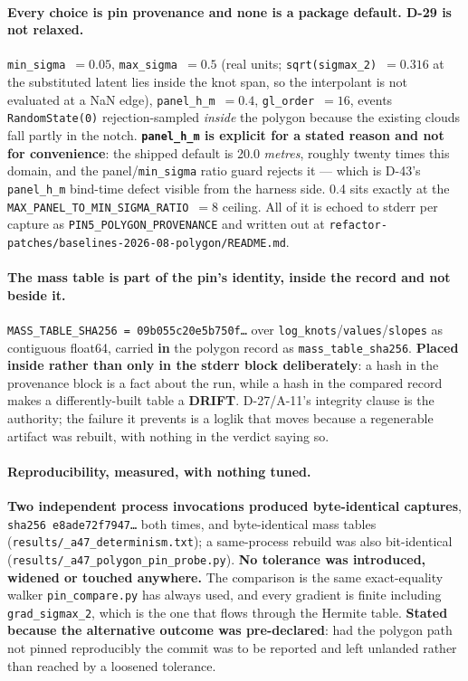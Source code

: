 \documentclass[
  10pt,
]{article}
\begin{document}
\paragraph{Every choice is pin provenance and none is a package default. D-29 is not relaxed.}
\texttt{min\_sigma}~$=0.05$, \texttt{max\_sigma}~$=0.5$ (real units; \texttt{sqrt(sigmax\_2)}~$=0.316$ at the substituted latent lies inside the knot span, so the interpolant is not evaluated at a NaN edge), \texttt{panel\_h\_m}~$=0.4$, \texttt{gl\_order}~$=16$, events \texttt{RandomState(0)} rejection-sampled \emph{inside} the polygon because the existing clouds fall partly in the notch. \textbf{\texttt{panel\_h\_m} is explicit for a stated reason and not for convenience}: the shipped default is 20.0 \emph{metres}, roughly twenty times this domain, and the panel/\texttt{min\_sigma} ratio guard rejects it --- which is D-43's \texttt{panel\_h\_m} bind-time defect visible from the harness side. 0.4 sits exactly at the \texttt{MAX\_PANEL\_TO\_MIN\_SIGMA\_RATIO}~$=8$ ceiling. All of it is echoed to stderr per capture as \texttt{PIN5\_POLYGON\_PROVENANCE} and written out at \texttt{refactor-patches/\allowbreak{}baselines-2026-08-polygon/\allowbreak{}README.md}.

\paragraph{The mass table is part of the pin's identity, inside the record and not beside it.}
\texttt{MASS\_TABLE\_SHA256 = 09b055c20e5b750f\dots} over \texttt{log\_knots}/\texttt{values}/\texttt{slopes} as contiguous float64, carried \textbf{in} the polygon record as \texttt{mass\_table\_sha256}. \textbf{Placed inside rather than only in the stderr block deliberately}: a hash in the provenance block is a fact about the run, while a hash in the compared record makes a differently-built table a \textbf{DRIFT}. D-27/A-11's integrity clause is the authority; the failure it prevents is a loglik that moves because a regenerable artifact was rebuilt, with nothing in the verdict saying so.

\paragraph{Reproducibility, measured, with nothing tuned.}
\textbf{Two independent process invocations produced byte-identical captures}, \texttt{sha256 e8ade72f7947\dots} both times, and byte-identical mass tables (\texttt{results/\allowbreak{}\_a47\_determinism.txt}); a same-process rebuild was also bit-identical (\texttt{results/\allowbreak{}\_a47\_polygon\_pin\_probe.py}). \textbf{No tolerance was introduced, widened or touched anywhere.} The comparison is the same exact-equality walker \texttt{pin\_compare.py} has always used, and every gradient is finite including \texttt{grad\_sigmax\_2}, which is the one that flows through the Hermite table. \textbf{Stated because the alternative outcome was pre-declared}: had the polygon path not pinned reproducibly the commit was to be reported and left unlanded rather than reached by a loosened tolerance.
\end{document}
